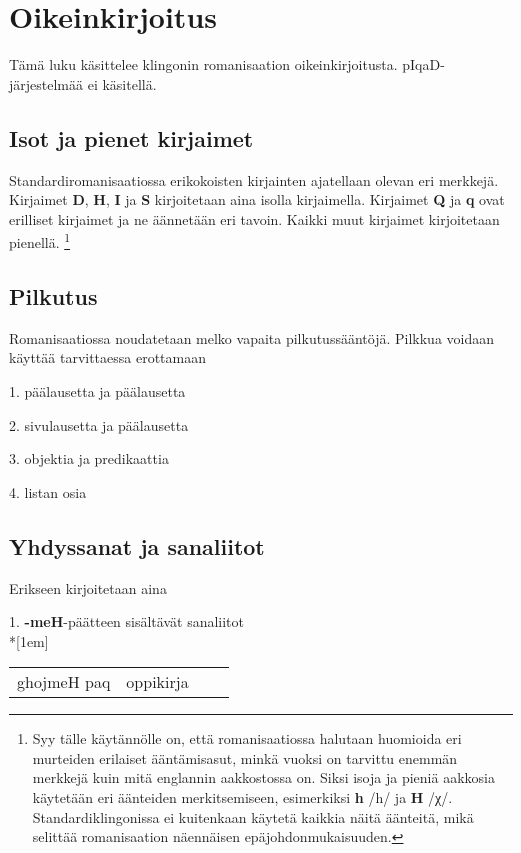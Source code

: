 \documentclass{book}
\begin{document}
\chapter{Oikeinkirjoitus}

Tämä luku käsittelee klingonin romanisaation oikeinkirjoitusta.
pIqaD-järjestelmää ei käsitellä.

\section{Isot ja pienet kirjaimet}

Standardiromanisaatiossa erikokoisten kirjainten ajatellaan olevan eri merkkejä.
Kirjaimet \textbf{D}, \textbf{H}, \textbf{I} ja \textbf{S} kirjoitetaan aina isolla kirjaimella.
Kirjaimet \textbf{Q} ja \textbf{q} ovat erilliset kirjaimet ja ne äännetään eri tavoin.
Kaikki muut kirjaimet kirjoitetaan pienellä.
\footnote{
    Syy tälle käytännölle on, että romanisaatiossa halutaan huomioida eri murteiden erilaiset ääntämisasut, minkä vuoksi on tarvittu enemmän merkkejä kuin mitä englannin aakkostossa on.
    Siksi isoja ja pieniä aakkosia käytetään eri äänteiden merkitsemiseen, esimerkiksi \textbf{h} /h/ ja \textbf{H} /χ/.
    Standardiklingonissa ei kuitenkaan käytetä kaikkia näitä äänteitä, mikä selittää romanisaation näennäisen epäjohdonmukaisuuden.
}

\section{Pilkutus}

Romanisaatiossa noudatetaan melko vapaita pilkutussääntöjä.
Pilkkua voidaan käyttää tarvittaessa erottamaan

1. päälausetta ja päälausetta

2. sivulausetta ja päälausetta

3. objektia ja predikaattia

4. listan osia

\section{Yhdyssanat ja sanaliitot}

Erikseen kirjoitetaan aina

1. \textbf{-meH}-päätteen sisältävät sanaliitot\\*[1em]
\begin{tabular}{Bl Il}
    ghojmeH paq & oppikirja \\
\end{tabular}
\end{document}
